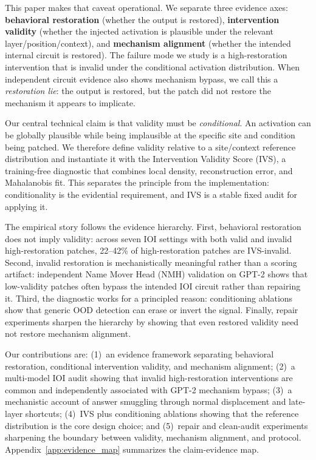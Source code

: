 \documentclass{article}
\begin{document}
This paper makes that caveat operational. We separate three evidence axes: \textbf{behavioral restoration} (whether the output is restored), \textbf{intervention validity} (whether the injected activation is plausible under the relevant layer/position/context), and \textbf{mechanism alignment} (whether the intended internal circuit is restored). The failure mode we study is a high-restoration intervention that is invalid under the conditional activation distribution. When independent circuit evidence also shows mechanism bypass, we call this a \emph{restoration lie}: the output is restored, but the patch did not restore the mechanism it appears to implicate.

Our central technical claim is that validity must be \emph{conditional}. An activation can be globally plausible while being implausible at the specific site and condition being patched. We therefore define validity relative to a site/context reference distribution and instantiate it with the Intervention Validity Score (IVS), a training-free diagnostic that combines local density, reconstruction error, and Mahalanobis fit. This separates the principle from the implementation: conditionality is the evidential requirement, and IVS is a stable fixed audit for applying it.

The empirical story follows the evidence hierarchy. First, behavioral restoration does not imply validity: across seven IOI settings with both valid and invalid high-restoration patches, 22--42\% of high-restoration patches are IVS-invalid. Second, invalid restoration is mechanistically meaningful rather than a scoring artifact: independent Name Mover Head (NMH) validation on GPT-2 shows that low-validity patches often bypass the intended IOI circuit rather than repairing it. Third, the diagnostic works for a principled reason: conditioning ablations show that generic OOD detection can erase or invert the signal. Finally, repair experiments sharpen the hierarchy by showing that even restored validity need not restore mechanism alignment.

Our contributions are: (1)~an evidence framework separating behavioral restoration, conditional intervention validity, and mechanism alignment; (2)~a multi-model IOI audit showing that invalid high-restoration interventions are common and independently associated with GPT-2 mechanism bypass; (3)~a mechanistic account of answer smuggling through normal displacement and late-layer shortcuts; (4)~IVS plus conditioning ablations showing that the reference distribution is the core design choice; and (5)~repair and clean-audit experiments sharpening the boundary between validity, mechanism alignment, and protocol. Appendix~\ref{app:evidence_map} summarizes the claim-evidence map.
\end{document}
